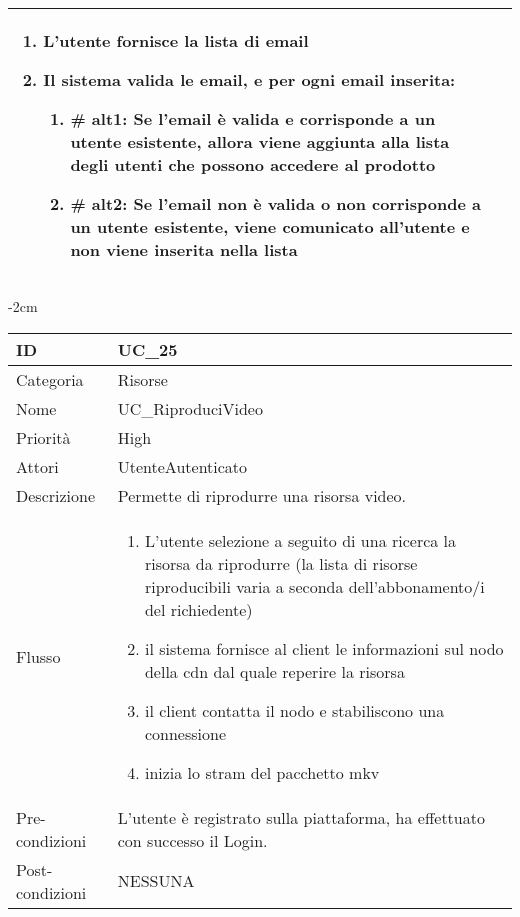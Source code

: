 \begin{center}
\begin{table}[bp]
\begin{tabular}{ |p{2.6cm}|p{13cm}|  }
\begin{enumerate}
\begin{enumerate}[  ]
\begin{enumerate}[label*=\arabic*.]
						\item L'utente fornisce la lista di email
						\item Il sistema valida le email, e per ogni email inserita:
							\begin{enumerate}[label*=\arabic*.]
								\item \textbf{\# alt1:} Se l'email è valida e corrisponde a un utente esistente, allora viene aggiunta alla lista degli utenti che possono accedere al prodotto
								\item \textbf{\# alt2:} Se l'email non è valida o non corrisponde a un utente esistente, viene comunicato all'utente e non viene inserita nella lista
							\end{enumerate}
					\end{enumerate}
				\end{enumerate}
		\end{enumerate}\\\hline
\end{tabular}
\label{table_use_case:24}\newline
\end{table}


\begin{table}[bp]
    \centering
    \addtolength{\leftskip} {-2cm}
\begin{tabular}{ |p{2.6cm}|p{13cm}|  }
\hline
ID & UC\_25 \\\hline
Categoria & Risorse\\\hline
Nome & UC\_RiproduciVideo\\\hline
Priorità & High \\\hline
Attori &  UtenteAutenticato \\\hline
Descrizione & Permette di riprodurre una risorsa video.\\\hline
Flusso &  	\vspace{-5mm} \begin{enumerate}
			\item L'utente selezione a seguito di una ricerca la risorsa da riprodurre (la lista di risorse riproducibili varia a seconda dell'abbonamento/i del richiedente)
			\item il sistema fornisce al client le informazioni sul nodo della cdn dal quale reperire la risorsa 
			\item il client contatta il nodo e stabiliscono una connessione
			\item inizia lo stram del pacchetto mkv 
			\end{enumerate}
			\\\hline
Pre-condizioni & L'utente è registrato sulla piattaforma, ha effettuato con successo il Login.\\\hline
Post-condizioni & NESSUNA\\\hline
\end{tabular}
\label{table_use_case:25}\newline
\end{table}


\end{center}

